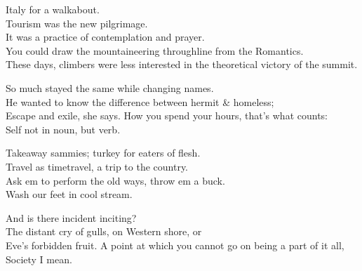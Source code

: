 Italy for a walkabout.  \\
Tourism was the new pilgrimage. \\
It was a practice of contemplation and prayer. \\
You could draw the mountaineering throughline from the Romantics. \\
These days, climbers were less interested in the theoretical victory of the summit.

So much stayed the same while changing names. \\
He wanted to know the difference between hermit \& homeless; \\
Escape and exile, she says.
How you spend your hours, that's what counts: \\
Self not in noun, but verb.

Takeaway sammies; turkey for eaters of flesh. \\
Travel as timetravel, a trip to the country. \\
Ask em to perform the old ways, throw em a buck. \\
Wash our feet in cool stream.

And is there incident inciting? \\
The distant cry of gulls, on Western shore, or \\
Eve's forbidden fruit. A point at which you cannot go on being a part of it all, \\
Society I mean.